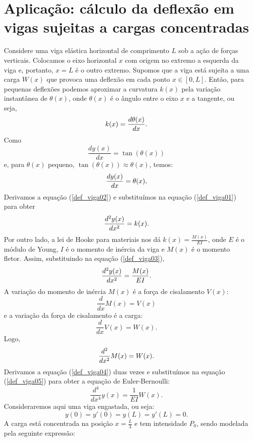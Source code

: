 \section{Aplicação: cálculo da deflexão em vigas sujeitas a cargas concentradas}
Considere uma viga elástica horizontal de comprimento $L$ sob a ação de forças verticais. Colocamos o eixo horizontal $x$ com origem no extremo a esquerda da viga e, portanto, $x=L$ é o outro extremo. Supomos que a viga está sujeita a uma carga $W(x)$ que provoca uma deflexão em cada ponto $x\in[0,L]$. Então, para pequenas deflexões podemos aproximar a curvatura $k(x)$ pela variação instantânea de $\theta(x)$, onde $\theta(x)$ é o ângulo entre o eixo $x$ e a tangente, ou seja, 
\begin{equation}{\label{def_viga01}}
k(x)=\frac{d\theta(x)}{dx}.
\end{equation}
Como
$$
\frac{dy(x)}{dx}=\tan(\theta(x))
$$
e, para $\theta(x)$ pequeno, $\tan(\theta(x))\approx \theta(x)$, temos:
\begin{equation}{\label{def_viga02}}
\frac{dy(x)}{dx}=\theta(x),
\end{equation}
Derivamos a equação (\ref{def_viga02}) e substituímos na equação (\ref{def_viga01}) para obter
\begin{equation}{\label{def_viga03}}
\frac{d^2y(x)}{dx^2}=k(x).
\end{equation}
Por outro lado, a lei de Hooke para materiais nos dá $k(x)=\frac{M(x)}{EI}$, onde $E$ é o módulo de Young, $I$ é o momento de inércia da viga e $M(x)$ é o momento fletor. Assim, substituindo na equação (\ref{def_viga03}),
\begin{equation}{\label{def_viga04}}
\frac{d^2y(x)}{dx^2}=\frac{M(x)}{EI}.
\end{equation}
A variação do momento de inércia $M(x)$ é a força de cisalamento $V(x)$:
$$
\frac{d}{dx}M(x)=V(x)
$$
e a variação da força de cisalamento é a carga:
$$
\frac{d}{dx}V(x)=W(x).
$$
Logo,
\begin{equation}{\label{def_viga05}}
\frac{d^2}{dx^2}M(x)=W(x).
\end{equation}
Derivamos a equação (\ref{def_viga04}) duas vezes e substituímos na equação (\ref{def_viga05}) para obter a equação de Euler-Bernoulli:
\begin{equation}
\label{eq}\frac{d^4}{dx^4}y(x)=\frac{1}{EI}W(x).
\end{equation}
Consideraremos aqui uma viga engastada, ou seja: $$y(0)=y'(0)=y(L)=y'(L)=0.$$
A carga está concentrada na posição $x=\frac{L}{3}$ e tem intensidade $P_0$, sendo modelada pela seguinte expressão:

